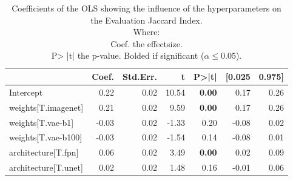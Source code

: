 \begin{table}[ht]
    \centering
    \caption{Coefficients of the OLS showing the influence of the hyperparameters on the Evaluation Jaccard Index.\\Where:\\\hphantom{tabb}Coef. the effectsize.\\\hphantom{tabb}P> |t| the p-value. Bolded if significant ($\alpha\le0.05$).}
    \label{tab:comparison_baselines_ols_effects}
    \begin{tabular}{lrrrrrr}
        \toprule
                             & Coef. & Std.Err. & t     & P>|t|         & [0.025 & 0.975] \\
        \midrule
        Intercept            & 0.22  & 0.02     & 10.54 & \textbf{0.00} & 0.17   & 0.26   \\
        weights[T.imagenet]  & 0.21  & 0.02     & 9.59  & \textbf{0.00} & 0.17   & 0.26   \\
        weights[T.vae-b1]    & -0.03 & 0.02     & -1.33 & 0.20          & -0.08  & 0.02   \\
        weights[T.vae-b100]  & -0.03 & 0.02     & -1.54 & 0.14          & -0.08  & 0.01   \\
        architecture[T.fpn]  & 0.06  & 0.02     & 3.49  & \textbf{0.00} & 0.02   & 0.09   \\
        architecture[T.unet] & 0.02  & 0.02     & 1.48  & 0.16          & -0.01  & 0.06   \\
        \bottomrule
    \end{tabular}
\end{table}
